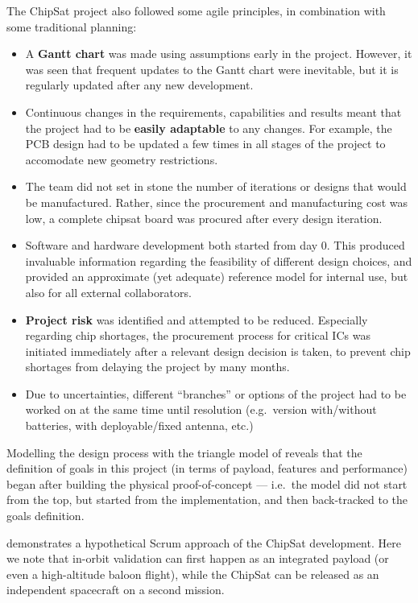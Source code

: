 \documentclass[]{iac}
\begin{document}
The ChipSat project also followed some agile principles, in combination with some traditional planning:
\begin{itemize}
    \item A \textbf{Gantt chart} was made using assumptions early in the project. However, it was seen that frequent updates to the Gantt chart were inevitable,  but it is regularly updated after any new development.
    \item Continuous changes in the requirements, capabilities and results meant that the project had to be \textbf{easily adaptable} to any changes. For example, the \acs{PCB} design had to be updated a few times in all stages of the project to accomodate new geometry restrictions.
    \item The team did not set in stone the number of iterations or designs that would be manufactured. Rather, since the procurement and manufacturing cost was low, a complete chipsat board was procured after every design iteration.
    \item Software and hardware development both started from day 0. This produced invaluable information regarding the feasibility of different design choices, and provided an approximate (yet adequate) reference model for internal use, but also for all external collaborators.
    \item \textbf{Project risk} was identified and attempted to be reduced. Especially regarding chip shortages, the procurement process for critical \acsp{IC} was initiated immediately after a relevant design decision is taken, to prevent chip shortages from delaying the project by many months.
    \item Due to uncertainties, different ``branches'' or options of the project had to be worked on at the same time until resolution (e.g.~version with/without batteries, with deployable/fixed antenna, etc.)
\end{itemize}

Modelling the design process with the triangle model of  reveals that the definition of goals in this project (in terms of payload, features and performance) began after building the physical proof-of-concept --- i.e.~the model did not start from the top, but started from the implementation, and then back-tracked to the goals definition.

 demonstrates a hypothetical Scrum approach of the ChipSat development. Here we note that in-orbit validation can first happen as an integrated payload (or even a high-altitude baloon flight), while the ChipSat can be released as an independent spacecraft on a second mission.
\end{document}
